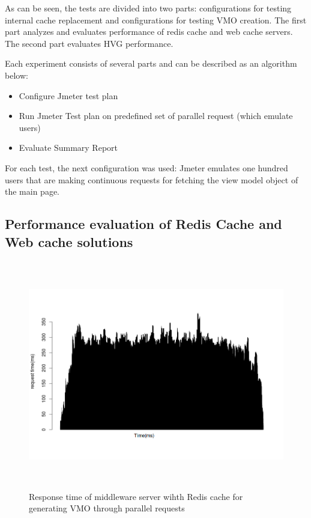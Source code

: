 As can be seen, the tests are divided into two parts: configurations for testing internal cache replacement and configurations for testing VMO creation. The first part analyzes and evaluates performance of redis cache and web cache servers. The second part  evaluates HVG performance.

Each experiment consists of several parts and can be described as an algorithm below: 

\begin{itemize}
  \item Configure Jmeter test plan
  \item Run Jmeter Test plan on predefined set of parallel request (which emulate users)
  \item Evaluate Summary Report
\end{itemize}

For each test, the next configuration was used: Jmeter emulates one hundred users that are making continuous requests for fetching the view model object of the main page.  


\subsection{Performance evaluation of Redis Cache and Web cache solutions}


\begin{figure}[h!]
    \centering
    \includegraphics[width=15cm,height=10cm,keepaspectratio]{images/vmo_redis_mult_par.png}
    \caption{Response time of middleware server wihth Redis cache for generating VMO through parallel requests}
    \label{fig:vmo_redis_mult_par}
\end{figure}


